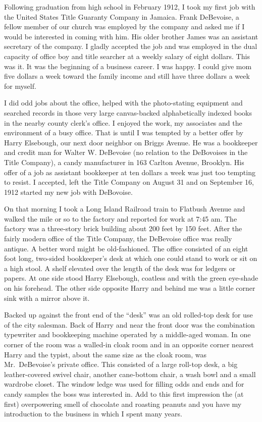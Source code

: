 \documentclass[12pt]{book}              %
\begin{document}
Following graduation from high school in February 1912, I took my first job with the United States Title Guaranty Company in Jamaica. Frank DeBevoise, a fellow member of our church was employed by the company and asked me if I would be interested in coming with him. His older brother James was an assistant secretary of the company. I gladly accepted the job and was employed in the dual capacity of office boy and title searcher at a weekly salary of eight dollars. This was it. It was the beginning of a business career. I was happy. I could give mom five dollars a week toward the family income and still have three dollars a week for myself.

I did odd jobs about the office, helped with the photo-stating equipment and searched records in those very large canvas-backed alphabetically indexed books in the nearby county clerk's office. I enjoyed the work, my associates and the environment of a busy office. That is until I was tempted by a better offer by Harry Elsebough, our next door neighbor on Briggs Avenue. He was a bookkeeper and credit man for Walter W. DeBevoise (no relation to the DeBovoises in the Title Company), a candy manufacturer in 163 Carlton Avenue, Brooklyn. His offer of a job as assistant bookkeeper at ten dollars a week was just too tempting to resist. I accepted, left the Title Company on August 31 and on September 16, 1912 started my new job with DeBovoise.

On that morning I took a Long Island Railroad train to Flatbush Avenue and walked the mile or so to the factory and reported for work at 7:45 am. The factory was a three-story brick building about 200 feet by 150 feet. After the fairly modern office of the Title Company, the DeBevoise office was really antique. A better word might be old-fashioned. The office consisted of an eight foot long, two-sided bookkeeper's desk at which one could stand to work or sit on a high stool. A shelf elevated over the length of the desk was for ledgers or papers. At one side stood Harry Elsebough, coatless and with the green eye-shade on his forehead. The other side opposite Harry and behind me was a little corner sink with a mirror above it. 

Backed up against the front end of the ``desk'' was an old rolled-top desk for use of the city salesman. Back of Harry and near the front door was the combination typewriter and bookkeeping machine operated by a middle-aged woman. In one corner of the room was a walled-in cloak room and in an opposite corner nearest Harry and the typist, about the same size as the cloak room, was Mr.~DeBevoise's private office. This consisted of a large roll-top desk, a big leather-covered swivel chair, another cane-bottom chair, a wash bowl and a small wardrobe closet. The window ledge was used for filling odds and ends and for candy samples the boss was interested in. Add to this first impression the (at first) overpowering smell of chocolate and roasting peanuts and you have my introduction to the business in which I spent many years.
\end{document}
